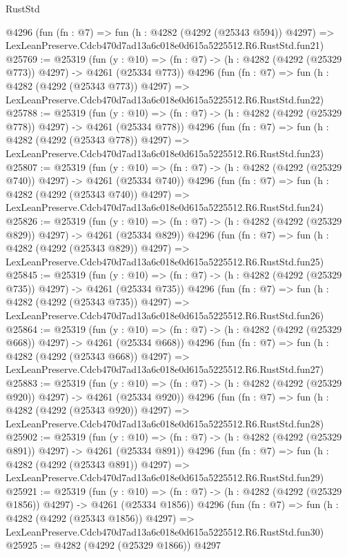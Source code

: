 \begin{lexlean}{RustStd}
\begin{coremodule}
    @4296
    (fun (fn : @7) =>
    fun (h : @4282 (@4292 (@25343 @594)) @4297) =>
    LexLeanPreserve.Cdcb470d7ad13a6c018e0d615a5225512.R6.RustStd.fun21)
@25769 := @25319
    (fun (y : @10) => (fn : @7) -> (h : @4282 (@4292 (@25329 @773)) @4297) -> @4261 (@25334 @773))
    @4296
    (fun (fn : @7) =>
    fun (h : @4282 (@4292 (@25343 @773)) @4297) =>
    LexLeanPreserve.Cdcb470d7ad13a6c018e0d615a5225512.R6.RustStd.fun22)
@25788 := @25319
    (fun (y : @10) => (fn : @7) -> (h : @4282 (@4292 (@25329 @778)) @4297) -> @4261 (@25334 @778))
    @4296
    (fun (fn : @7) =>
    fun (h : @4282 (@4292 (@25343 @778)) @4297) =>
    LexLeanPreserve.Cdcb470d7ad13a6c018e0d615a5225512.R6.RustStd.fun23)
@25807 := @25319
    (fun (y : @10) => (fn : @7) -> (h : @4282 (@4292 (@25329 @740)) @4297) -> @4261 (@25334 @740))
    @4296
    (fun (fn : @7) =>
    fun (h : @4282 (@4292 (@25343 @740)) @4297) =>
    LexLeanPreserve.Cdcb470d7ad13a6c018e0d615a5225512.R6.RustStd.fun24)
@25826 := @25319
    (fun (y : @10) => (fn : @7) -> (h : @4282 (@4292 (@25329 @829)) @4297) -> @4261 (@25334 @829))
    @4296
    (fun (fn : @7) =>
    fun (h : @4282 (@4292 (@25343 @829)) @4297) =>
    LexLeanPreserve.Cdcb470d7ad13a6c018e0d615a5225512.R6.RustStd.fun25)
@25845 := @25319
    (fun (y : @10) => (fn : @7) -> (h : @4282 (@4292 (@25329 @735)) @4297) -> @4261 (@25334 @735))
    @4296
    (fun (fn : @7) =>
    fun (h : @4282 (@4292 (@25343 @735)) @4297) =>
    LexLeanPreserve.Cdcb470d7ad13a6c018e0d615a5225512.R6.RustStd.fun26)
@25864 := @25319
    (fun (y : @10) => (fn : @7) -> (h : @4282 (@4292 (@25329 @668)) @4297) -> @4261 (@25334 @668))
    @4296
    (fun (fn : @7) =>
    fun (h : @4282 (@4292 (@25343 @668)) @4297) =>
    LexLeanPreserve.Cdcb470d7ad13a6c018e0d615a5225512.R6.RustStd.fun27)
@25883 := @25319
    (fun (y : @10) => (fn : @7) -> (h : @4282 (@4292 (@25329 @920)) @4297) -> @4261 (@25334 @920))
    @4296
    (fun (fn : @7) =>
    fun (h : @4282 (@4292 (@25343 @920)) @4297) =>
    LexLeanPreserve.Cdcb470d7ad13a6c018e0d615a5225512.R6.RustStd.fun28)
@25902 := @25319
    (fun (y : @10) => (fn : @7) -> (h : @4282 (@4292 (@25329 @891)) @4297) -> @4261 (@25334 @891))
    @4296
    (fun (fn : @7) =>
    fun (h : @4282 (@4292 (@25343 @891)) @4297) =>
    LexLeanPreserve.Cdcb470d7ad13a6c018e0d615a5225512.R6.RustStd.fun29)
@25921 := @25319
    (fun (y : @10) => (fn : @7) -> (h : @4282 (@4292 (@25329 @1856)) @4297) -> @4261 (@25334 @1856))
    @4296
    (fun (fn : @7) =>
    fun (h : @4282 (@4292 (@25343 @1856)) @4297) =>
    LexLeanPreserve.Cdcb470d7ad13a6c018e0d615a5225512.R6.RustStd.fun30)
@25925 := @4282 (@4292 (@25329 @1866)) @4297

\end{coremodule}
\end{lexlean}
